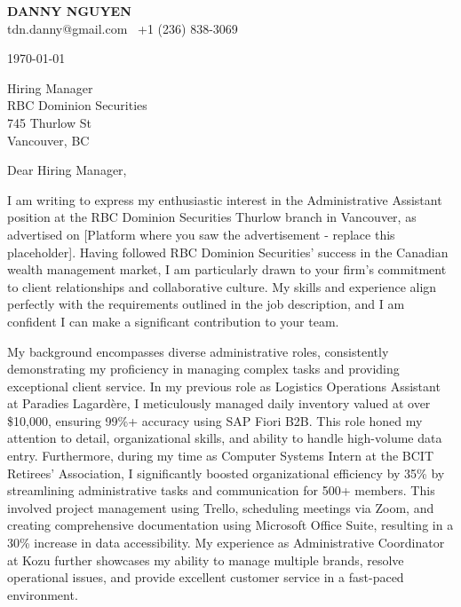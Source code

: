 \documentclass[letterpaper,11pt]{article}
\begin{document}
\textbf{DANNY NGUYEN} \\
tdn.danny@gmail.com \textbullet\ +1 (236) 838-3069 \\
\vspace{20pt}

\today \\
\vspace{20pt}

Hiring Manager \\
RBC Dominion Securities \\
745 Thurlow St \\
Vancouver, BC \\
\vspace{20pt}

Dear Hiring Manager, \\
\vspace{10pt}

I am writing to express my enthusiastic interest in the Administrative Assistant position at the RBC Dominion Securities Thurlow branch in Vancouver, as advertised on [Platform where you saw the advertisement -  replace this placeholder].  Having followed RBC Dominion Securities' success in the Canadian wealth management market, I am particularly drawn to your firm's commitment to client relationships and collaborative culture. My skills and experience align perfectly with the requirements outlined in the job description, and I am confident I can make a significant contribution to your team.

\vspace{10pt}

My background encompasses diverse administrative roles, consistently demonstrating my proficiency in managing complex tasks and providing exceptional client service.  In my previous role as Logistics Operations Assistant at Paradies Lagardère, I meticulously managed daily inventory valued at over \$10,000, ensuring 99\%+ accuracy using SAP Fiori B2B.  This role honed my attention to detail, organizational skills, and ability to handle high-volume data entry. Furthermore, during my time as Computer Systems Intern at the BCIT Retirees’ Association, I significantly boosted organizational efficiency by 35\% by streamlining administrative tasks and communication for 500+ members. This involved project management using Trello, scheduling meetings via Zoom, and creating comprehensive documentation using Microsoft Office Suite, resulting in a 30\% increase in data accessibility. My experience as Administrative Coordinator at Kozu further showcases my ability to manage multiple brands, resolve operational issues, and provide excellent customer service in a fast-paced environment.
\end{document}
